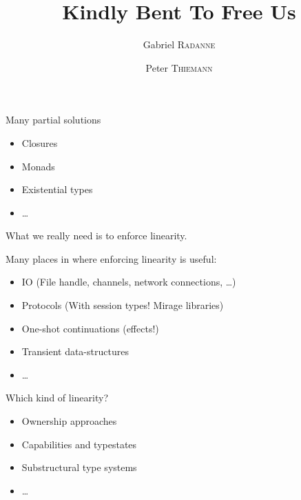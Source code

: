 \documentclass[xcolor=svgnames,11pt]{beamer}
\title{Kindly Bent To Free Us}
\author{Gabriel \textsc{Radanne} \and Peter \textsc{Thiemann}}
\begin{document}
\frame[plain]{\titlepage}

\begin{frame}
\end{frame}

\begin{frame}
  Many partial solutions
  \begin{itemize}
  \item Closures
  \item Monads
  \item Existential types
  \item \dots
  \end{itemize}
  \pause

  What we really need is to enforce linearity.
\end{frame}

\begin{frame}
  Many places in \ocaml where enforcing linearity is useful:
  \begin{itemize}
  \item IO (File handle, channels, network connections, \dots)
  \item Protocols (With session types! Mirage libraries)
  \item One-shot continuations (effects!)
  \item Transient data-structures
  \item \dots
  \end{itemize}
\end{frame}

\begin{frame}
  Which kind of linearity?
  \begin{itemize}
  \item \alert<2>{Ownership approaches}
    
  \item \alert<3>{Capabilities and typestates}
    
  \item \alert<4,6>{Substructural type systems}
    
  \item \alert<5>{\dots}
    
  \end{itemize}
\end{frame}
\end{document}

